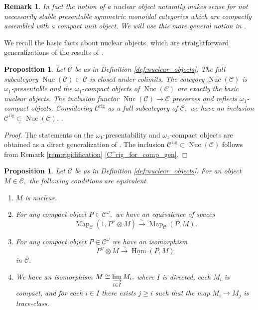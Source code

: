 \documentclass[11pt,leqno]{amsart}
\newtheorem{prop}[theo]{Proposition}
\newtheorem{remark}[theo]{Remark}
\numberwithin{equation}{section}
\def\Hom{\operatorname{Hom}}
\def\Map{\operatorname{Map}}
\newcommand{\indlim}[1][]{\mathop{\varinjlim}\limits_{#1}}
\newcommand{\xto}{\xrightarrow}
\newcommand{\rig}{\operatorname{rig}}
\newcommand{\Nuc}{\operatorname{Nuc}}
\newcommand{\cC}{{\mathcal C}}
\newcommand{\un}{\underline}
\begin{document}
\begin{remark}
In fact the notion of a nuclear object naturally makes sense for not necessarily stable presentable symmetric monoidal categories which are compactly assembled with a compact unit object. We will use this more general notion in \cite{E}.
\end{remark}

We recall the basic facts about nuclear objects, which are straightforward generalizations of the results of \cite[Section 13]{CS20}.

\begin{prop}\label{prop:nuclear_is_omega_1_presentable}
	Let $\cC$ be as in Definition \ref{def:nuclear_objects}. The full subcategory $\Nuc(\cC)\subset\cC$ is closed under colimits. The category $\Nuc(\cC)$ is $\omega_1$-presentable and the $\omega_1$-compact objects of $\Nuc(\cC)$ are exactly the basic nuclear objects. The inclusion functor $\Nuc(\cC)\to \cC$ preserves and reflects $\omega_1$-compact objects. Considering $\cC^{\rig}$ as a full subcategory of $\cC,$ we have an inclusion $\cC^{\rig}\subset\Nuc(\cC).$ .
\end{prop}

\begin{proof}
The statements on the $\omega_1$-presentability and $\omega_1$-compact objects are obtained as a direct generalization of \cite[Proposition 13.13]{CS20}. The inclusion $\cC^{\rig}\subset\Nuc(\cC)$ follows from Remark \ref{rem:rigidification} \ref{C^rig_for_comp_gen}.
\end{proof}

\begin{prop}\label{prop:equiv_for_nuclear}
Let $\cC$ be as in Definition \ref{def:nuclear_objects}. For an object $M\in\cC,$ the following conditions are equivalent.
\begin{enumerate}[label=(\roman*), ref=(\roman*)]
\item $M$ is nuclear.
\item For any compact object $P\in\cC^{\omega},$ we have an equivalence of spaces
\begin{equation*}
\Map_{\cC}(1,P^{\vee}\otimes M)\xto{\sim} \Map_{\cC}(P,M).
\end{equation*}
\item For any compact object $P\in\cC^{\omega}$ we have an isomorphism
\begin{equation*}
P^{\vee}\otimes M\xto{\sim} \un{\Hom}(P,M)
\end{equation*}
in $\cC.$
\item We have an isomorphism $M\cong \indlim[i\in I]M_i,$ where $I$ is directed, each $M_i$ is compact, and for each $i\in I$ there exists $j\geq i$ such that the map $M_i\to M_j$ is trace-class. \label{nuclear_via_trace_class_approx}
\end{enumerate} 
\end{prop}
\end{document}
